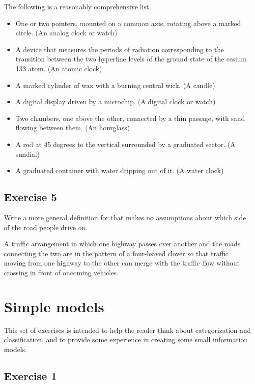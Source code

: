 \documentclass{article}
\begin{document}
    The following is a reasonably comprehensive list.
\begin{itemize}
\item One or two pointers, mounted on a common axis, rotating above a marked
      circle. (An analog clock or watch)
\item A device that measures the periods of radiation corresponding to the
      transition between the two hyperfine levels of the ground state
      of the cesium 133 atom. (An atomic clock)
\item A marked cylinder of wax with a burning central wick. (A candle)
\item A digital display driven by a microchip. (A digital clock or watch)
\item Two chambers, one above the other, connected by a thin passage, with 
      sand flowing between them. (An hourglass)
\item A rod at 45 degrees to the vertical surrounded by a graduated sector.
      (A sundial)
\item A graduated container with water dripping out of it. (A water clock)
\end{itemize}

\subsection{Exercise 5}

\begin{itshape}
Write a more general definition for  that makes no assumptions
      about which side of the road people drive on.
\end{itshape}

    A traffic arrangement in which one highway passes over another and the
roads connecting the two are in the pattern of a four-leaved clover so that
traffic moving from one highway to the other can merge with the traffic
flow without crossing in front of oncoming vehicles.


\clearpage


\section{Simple models}

    This set of exercises is intended to help the reader think about
categorization and classification, and to provide some experience in 
creating some small information models.

\subsection{Exercise 1}
\end{document}
